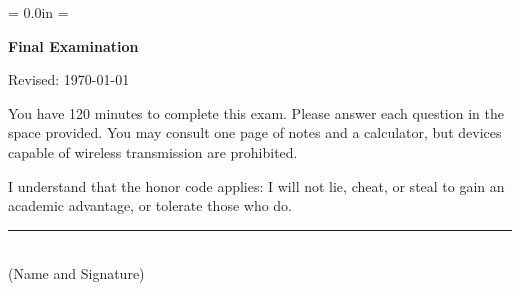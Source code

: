 \documentclass[letterpaper,12pt]{exam}
\def\HeadName{Final Examination}
\begin{document}
\parindent = 0.0in
\parskip = \bigskipamount
\thispagestyle{empty}%
\Head

\centerline{\large \bf \HeadName}%
\centerline{Revised:  \today}

\bigskip
You have 120 minutes to complete this exam.  Please answer each
question in the space provided. You may consult one page of notes
and a calculator, but devices capable of wireless transmission are
prohibited.

I understand that the honor code applies: I will not lie, cheat,
or steal to gain an academic advantage, or tolerate those who do.

\begin{flushright}
\rule{4in}{0.5pt} \\ (Name and Signature)
\end{flushright}

\end{document}
